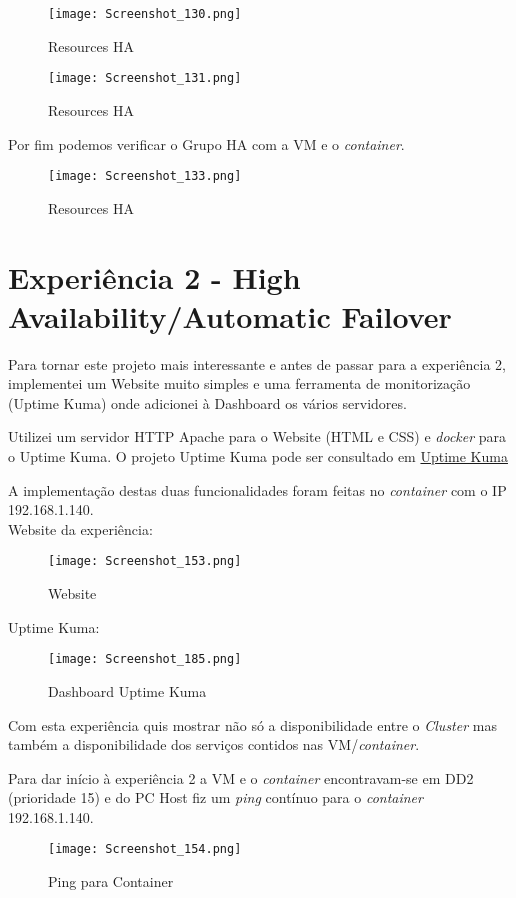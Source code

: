 \begin{figure}[H]
\center
\texttt{[image: Screenshot\_130.png]}
\caption{Resources HA}
\end{figure}

\begin{figure}[H]
\center
\texttt{[image: Screenshot\_131.png]}
\caption{Resources HA}
\end{figure}

\newpage
Por fim podemos verificar o Grupo \ac{HA} com a \ac{VM} e o \textit{container}.
\begin{figure}[H]
\center
\texttt{[image: Screenshot\_133.png]}
\caption{Resources HA}
\end{figure}

\newpage
\section{Experiência 2 - High Availability/Automatic Failover}
Para tornar este projeto mais interessante e antes de passar para a experiência 2, implementei um Website muito simples e uma ferramenta de monitorização (Uptime Kuma) onde adicionei à Dashboard os vários servidores.

Utilizei um servidor HTTP Apache para o Website (\ac{HTML} e \ac{CSS}) e \textit{docker} para o Uptime Kuma. O projeto Uptime Kuma pode ser consultado em  \href{https://github.com/louislam/uptime-kuma}{Uptime Kuma}

 A implementação destas duas funcionalidades foram feitas no \textit{container} com o \ac{IP} 192.168.1.140.\\

 Website da experiência:
\begin{figure}[H]
\center
\texttt{[image: Screenshot\_153.png]}
\caption{Website}
\end{figure}

Uptime Kuma:
\begin{figure}[H]
\center
\texttt{[image: Screenshot\_185.png]}
\caption{Dashboard Uptime Kuma}
\end{figure}

\newpage
Com esta experiência quis mostrar não só a disponibilidade entre o \textit{Cluster} mas também a disponibilidade dos serviços contidos nas \ac{VM}/\textit{container}.

Para dar início à experiência 2 a \ac{VM} e o \textit{container} encontravam-se em DD2 (prioridade 15) e do \ac{PC} Host fiz um \textit{ping} contínuo para o \textit{container} 192.168.1.140.
\begin{figure}[H]
\center
\texttt{[image: Screenshot\_154.png]}
\caption{Ping para Container}
\end{figure}

